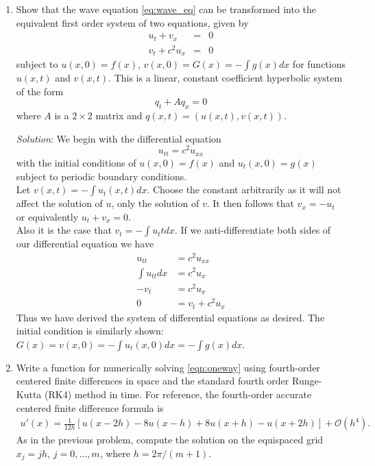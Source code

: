 \documentclass[final,oneside,onecolumn]{article}
\begin{document}
\begin{enumerate}
\begin{enumerate}
\item Show that the wave equation \eqref{eq:wave_eq} can be transformed into the equivalent first order system of two equations, given by
\begin{equation}
\begin{aligned}
u_t + v_x & = & 0 \\
v_t + c^2 u_x & = & 0
\end{aligned}
\label{eqn:oneway}
\end{equation}
\noindent
subject to $u(x,0) = f(x)$, $v(x,0) = G(x) = -\int g(x) dx$ for functions $u(x,t)$ and $v(x,t)$.  This is a linear, constant coefficient
hyperbolic system of the form
\begin{equation}
q_t + Aq_x = 0
\label{eqn:sys}
\end{equation}
\noindent
where $A$ is a $2 \times 2$ matrix and $q(x,t) = (u(x,t),v(x,t))$.
\bigbreak

\textit{Solution}: We begin with the differential equation
$$
u_{tt} = c^2u_{xx}
$$
with the initial conditions of $u(x,0) = f(x)$ and $u_t(x,0) = g(x)$ subject to periodic boundary conditions.\\
Let $v(x,t) = -\int u_t(x,t) dx$. Choose the constant arbitrarily as it will not affect the solution of $u$, only the solution of $v$. It then follows that $v_x = -u_t$ or equivalently $u_t + v_x = 0$. \\
Also it is the case that $v_t = -\int u_tt dx$. If we anti-differentiate both sides of our differential equation we have
\begin{align*}
	u_{tt} &= c^2u_{xx} \\
	\int u_{tt} dx &= c^2 u_x \\
	-v_t &= c^2 u_x \\
	0 &= v_t + c^2 u_x
\end{align*}
Thus we have derived the system of differential equations as desired. The initial condition is similarly shown: $G(x) = v(x,0) = -\int u_t(x,0) dx = -\int g(x) dx$.


\bigbreak
\item Write a function for numerically solving \eqref{eqn:oneway} using fourth-order centered finite differences in space and the standard fourth order Runge-Kutta (RK4) method in time.  
For reference, the fourth-order accurate centered finite difference formula is
\begin{align*}
u'(x) = \frac{1}{12h}\left[u(x-2h) -  8u(x-h)  + 8 u(x+h) - u(x+2h)\right] + \mathcal{O}(h^4).
\end{align*}
As in the previous problem, compute the solution on the equispaced grid $x_j = jh$, $j=0,\ldots,m$, where $h=2\pi/(m+1)$.
\bigbreak


\end{enumerate}
\end{enumerate}
\end{document}

